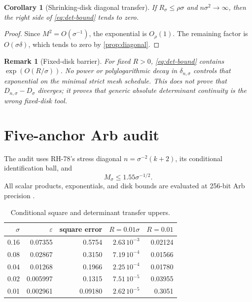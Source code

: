 \documentclass[11pt]{article}
\newtheorem{corollary}[theorem]{Corollary}
\newtheorem{remark}[theorem]{Remark}
\begin{document}
\begin{corollary}[Shrinking-disk diagonal transfer]
\label{cor:shrinking}
If $R_\sigma\le\rho\sigma$ and $n\sigma^2\to\infty$, then the right side of
\eqref{eq:det-bound} tends to zero.
\end{corollary}

\begin{proof}
Since $M^2=O(\sigma^{-1})$, the exponential is $O_\rho(1)$.  The remaining
factor is $O(\sigma\delta)$, which tends to zero by
\cref{prop:diagonal}.
\end{proof}

\begin{remark}[Fixed-disk barrier]
For fixed $R>0$, \eqref{eq:det-bound} contains
$\exp(O(R/\sigma))$.  No power or polylogarithmic decay in
$\delta_{n,\sigma}$ controls that exponential on the minimal strict mesh
schedule.  This does not prove that $D_{n,\sigma}-D_\sigma$ diverges; it proves
that generic absolute determinant continuity is the wrong fixed-disk tool.
\end{remark}

\section{Five-anchor Arb audit}

The audit uses RH-78's stress diagonal
$n=\sigma^{-2}(k+2)$, its conditional identification ball, and
\begin{equation}
 M_\sigma\le1.55\sigma^{-1/2}.
 \label{eq:bulk-constant}
\end{equation}
All scalar products, exponentials, and disk bounds are evaluated at 256-bit
Arb precision \citep{Johansson2017}.

\begin{table}[H]
\centering
\small
\caption{Conditional square and determinant transfer uppers.}
\label{tab:audit}
\begin{tabular}{@{}rrrrr@{}}
\toprule
$\sigma$ & $\varepsilon$ & square error & $R=0.01\sigma$ & $R=0.01$\\
\midrule
0.16 & 0.07355 & 0.5754 & $2.63\,10^{-3}$ & 0.02124\\
0.08 & 0.02867 & 0.3150 & $7.19\,10^{-4}$ & 0.01566\\
0.04 & 0.01268 & 0.1966 & $2.25\,10^{-4}$ & 0.01780\\
0.02 & 0.005997 & 0.1315 & $7.51\,10^{-5}$ & 0.03955\\
0.01 & 0.002961 & 0.09180 & $2.62\,10^{-5}$ & 0.3051\\
\bottomrule
\end{tabular}
\end{table}
\end{document}
